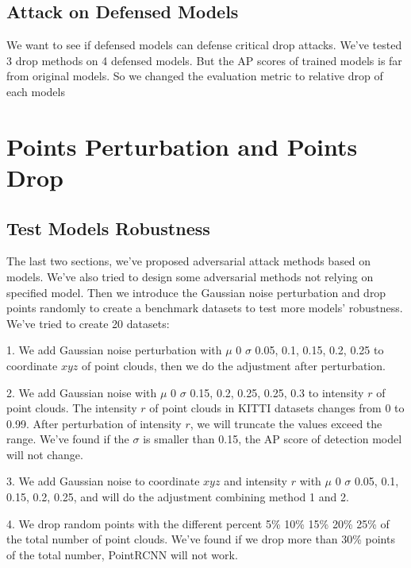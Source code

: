 \subsection{Attack on Defensed Models}
We want to see if defensed models can defense critical drop attacks. We've tested 3 drop methods on 4 defensed models. But the AP scores of trained models is far from original models. So we changed the evaluation metric to relative drop of each models
\section{Points Perturbation and Points Drop}
\subsection{Test Models Robustness}
The last two sections, we've proposed adversarial attack methods based on models. We've also tried to design some adversarial methods not relying on specified model. Then we introduce the Gaussian noise perturbation and drop points randomly to create a benchmark datasets to test more models' robustness.
We've tried to create 20 datasets:

1. We add Gaussian noise perturbation with \(\mu\) 0 \(\sigma\) 0.05, 0.1, 0.15, 0.2, 0.25 to coordinate \(xyz\) of point clouds, then we do the adjustment after perturbation.

2. We add Gaussian noise with \(\mu\) 0 \(\sigma\) 0.15, 0.2, 0.25, 0.25, 0.3 to intensity \(r\) of point clouds. The intensity \(r\) of point clouds in KITTI\cite{geiger_vision_2013} datasets changes from 0 to 0.99. After perturbation of intensity \(r\), we will truncate the values exceed the range. We've found if the \(\sigma\) is smaller than 0.15, the AP score of detection model will not change.

3. We add Gaussian noise to coordinate \(xyz\) and intensity \(r\) with \(\mu\) 0 \(\sigma\) 0.05, 0.1, 0.15, 0.2, 0.25, and will do the adjustment combining method 1 and 2. 

4. We drop random points with the different percent 5\% 10\% 15\% 20\% 25\% of the total number of point clouds. We've found if we drop more than 30\% points of the total number, PointRCNN\cite{shi_pointrcnn_2019} will not work.

